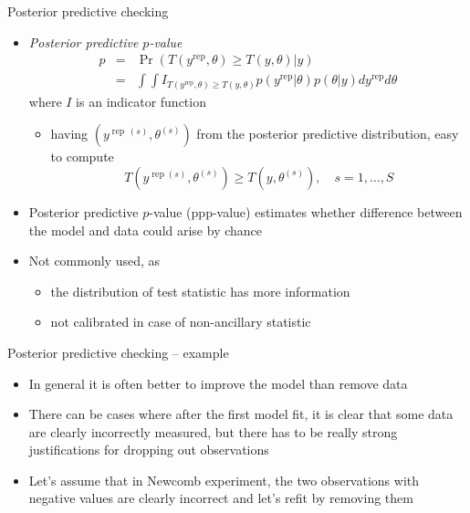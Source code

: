 \documentclass[t]{beamer}
\DeclareMathOperator{\rep}{\mathrm{rep}}
\begin{document}
\begin{frame}{Posterior predictive checking}

  \begin{itemize}
  \item<1-> \textit{Posterior predictive $p$-value}
    \begin{eqnarray*}
      p & = & \Pr(T(y^{\rep},\theta)\geq T(y,\theta)|y)\\
      & = & \int\int
      I_{T(y^{\rep},\theta)\geq T(y,\theta)}p(y^{\rep}|\theta)p(\theta|y)dy^{\rep}d\theta
    \end{eqnarray*}
    where $I$ is an indicator function
    \begin{itemize}
    \item<2->  having $(y^{\rep\,(s)},\theta^{(s)})$ from the posterior predictive
      distribution, easy to compute
      \begin{equation*}
        T(y^{\rep (s)},\theta^{(s)})\geq T(y,\theta^{(s)}), \quad s=1,\ldots,S
      \end{equation*}
    \end{itemize}
    \vspace{-1.5\baselineskip}
  \item<3-> Posterior predictive $p$-value (ppp-value) estimates whether
    difference between the model and data could arise by chance
  \item<4-> \color{black} Not commonly used, as
    \begin{itemize}
    \item the distribution of test statistic has more information
    \item not calibrated in case of non-ancillary statistic
    \end{itemize}
  \end{itemize}

\end{frame}

\begin{frame}{Posterior predictive checking -- example}

  \begin{itemize}
  \item In general it is often better to improve the model than remove
    data
  \item There can be cases where after the first model fit, it is
    clear that some data are clearly incorrectly measured, but there
    has to be really strong justifications for dropping out
    observations
  \item<2-> Let's assume that in Newcomb experiment, the two observations
    with negative values are clearly incorrect and let's refit by
    removing them
  \end{itemize}

\end{frame}
\end{document}
